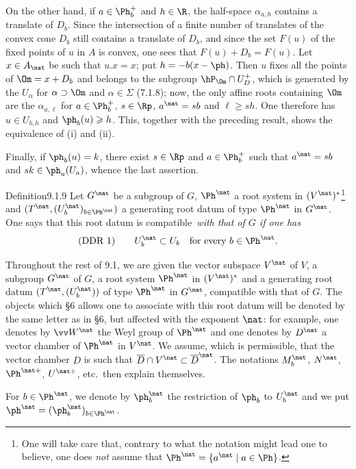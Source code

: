 \documentclass[12pt,a4paper,oneside,english]{smfart}
\makeatletter
\newcommand{\btanchor}[1]{\leavevmode\Hy@raisedlink{\hypertarget{bt:#1}{}}}
\theoremstyle{definition}
\theoremstyle{bt}
\makeatother
\begin{document}
On the other hand, if $a\in\Ph^+_b$ and $h\in\R$, the half-space $\alpha_{a,h}$ contains
a translate of $D_b$. Since the intersection of a finite number of translates of the
convex cone $D_b$ still contains a translate of $D_b$, and since the set $F(u)$ of the
fixed points of $u$ in $A$ is convex, one sees that $F(u)+D_b=F(u)$. Let $x\in A_\nat$ be
such that $u.x=x$; put $h=-b(x-\ph)$. Then $u$ fixes all the points of $\Om=x+D_b$ and
belongs to the subgroup $\hP_\Om\cap U^+_D$, which is generated by the $U_\alpha$ for
$\alpha\supset\Om$ and $\alpha\in\Sigma$ (7.1.8); now, the only affine roots containing
$\Om$ are the $\alpha_{a,\ell}$ for $a\in\Ph^+_b$, $s\in\Rp$, $a^\nat=sb$ and
$\ell\geqslant sh$. One therefore has $u\in U_{b,h}$ and $\ph_b(u)\geqslant h$. This,
together with the preceding result, shows the equivalence of (i) and (ii).

Finally, if $\ph_b(u)=k$, there exist $s\in\Rp$ and $a\in\Ph^+_b$ such that $a^\nat=sb$
and $sk\in\ph_a(U_a)$, whence the last assertion.

\begin{stmt}{Definition}{9.1.9}\btanchor{9.1.9}
Let $G^\nat$ be a subgroup of $G$, $\Ph^\nat$ a root system in
$(V^\nat)^*$\footnote{\upshape One will take care that, contrary to what the notation
might lead one to believe, one does \emph{not} assume that
$\Ph^\nat=\{a^\nat\mid a\in\Ph\}$.} and $(T^\nat,(U^\nat_b)_{b\in\Ph^\nat})$ a
generating root datum of type $\Ph^\nat$ in $G^\nat$. One says that this root datum is
\upshape compatible\itshape\ with that of $G$ if one has
\[
\text{\upshape(DDR 1)}\qquad U^\nat_b\subset U_b\quad\text{for every }b\in\Ph^\nat .
\]
\end{stmt}

Throughout the rest of 9.1, we are given the vector subspace $V^\nat$ of $V$, a subgroup
$G^\nat$ of $G$, a root system $\Ph^\nat$ in $(V^\nat)^*$ and a generating root datum
$(T^\nat,(U^\nat_b))$ of type $\Ph^\nat$ in $G^\nat$, compatible with that of $G$. The
objects which \S6 allows one to associate with this root datum will be denoted by the
same letter as in \S6, but affected with the exponent $\nat$: for example, one denotes
by $\vv W^\nat$ the Weyl group of $\Ph^\nat$ and one denotes by $D^\nat$ a vector
chamber of $\Ph^\nat$ in $V^\nat$. We assume, which is permissible, that the vector
chamber $D$ is such that $\overline D\cap V^\nat\subset\overline D^\nat$. The notations
$M^\nat_b$, $N^\nat$, $\Ph^{\nat+}$, $U^{\nat+}$, etc.\ then explain themselves.

For $b\in\Ph^\nat$, we denote by $\ph^\nat_b$ the restriction of $\ph_b$ to $U^\nat_b$
and we put $\ph^\nat=(\ph^\nat_b)_{b\in\Ph^\nat}$.
\end{document}
